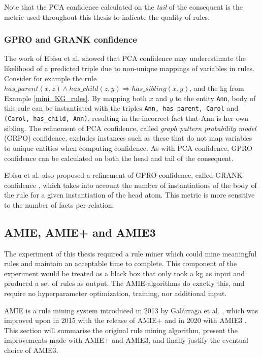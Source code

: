 Note that the PCA confidence calculated on the \textit{tail} of the consequent is the metric used throughout this thesis to indicate the quality of rules.

\subsubsection{GPRO and GRANK confidence}
The work of Ebisu et al. \cite{gpro} showed that PCA confidence may underestimate the likelihood of a predicted triple due to non-unique mappings of variables in rules. Consider for example the rule $has\_parent(x, z) \wedge has\_child(z, y) \Rightarrow has\_sibling(x, y)$, and the \gls{kg} from Example \ref{mini_KG_rules}. By mapping both $x$ and $y$ to the entity \texttt{Ann}, body of this rule can be instantiated with the triples \texttt{Ann, has\_parent, Carol} and \texttt{(Carol, has\_child, Ann)}, resulting in the incorrect fact that Ann is her own sibling. The refinement of PCA confidence, called \textit{graph pattern probability model} (GRPO) confidence, excludes instances such as these that do not map variables to unique entities when computing confidence. As with PCA confidence, GPRO confidence can be calculated on both the head and tail of the consequent.

Ebisu et al. also proposed a refinement of GPRO confidence, called GRANK confidence \cite{gpro}, which takes into account the number of instantiations of the body of the rule for a given instantiation of the head atom. This metric is more sensitive to the number of facts per relation.


\subsection{AMIE, AMIE+ and AMIE3}
\label{the_amies}
The experiment of this thesis required a rule miner which could mine meaningful rules and maintain an acceptable time to complete. This component of the experiment would be treated as a black box that only took a \gls{kg} as input and produced a set of rules as output. The AMIE-algorithms do exactly this, and require no hyperparameter optimization, training, nor additional input.

AMIE is a rule mining system introduced in 2013 by Galárraga et al. \cite{amie}, which was improved upon in 2015 with the release of AMIE+ \cite{amie_plus} and in 2020 with AMIE3 \cite{amie3}. This section will summarise the original rule mining algorithm, present the improvements made with AMIE+ and AMIE3, and finally justify the eventual choice of AMIE3.

